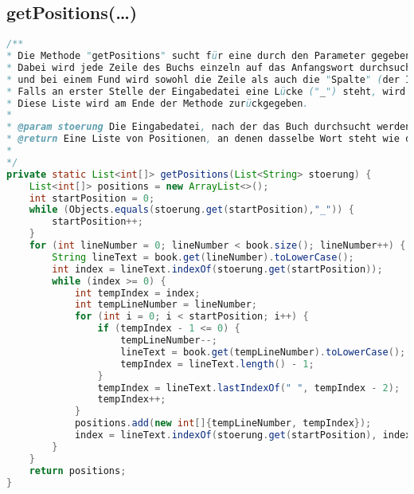 \documentclass[a4paper, 10pt, ngerman]{scrartcl}
\begin{document}
\subsection{getPositions(\ldots)}\label{sec:getPositions()}
\begin{lstlisting}[frame=single, language=Java, title=Methode getPositions, breaklines=true, label=lst:getPosition]
/**
* Die Methode "getPositions" sucht für eine durch den Parameter gegebene Eingabedatei das erste Wort im Buch.
* Dabei wird jede Zeile des Buchs einzeln auf das Anfangswort durchsucht
* und bei einem Fund wird sowohl die Zeile als auch die "Spalte" (der Index in der Zeile, an der das Wort beginnt) als Array an die Liste von Positionen hinzugefügt.
* Falls an erster Stelle der Eingabedatei eine Lücke ("_") steht, wird nach dem zweiten Wort gesucht und dann die Position für das vorherige Wort bestimmt.
* Diese Liste wird am Ende der Methode zurückgegeben.
*
* @param stoerung Die Eingabedatei, nach der das Buch durchsucht werden soll
* @return Eine Liste von Positionen, an denen dasselbe Wort steht wie das erste Wort der Eingabedatei
*
*/
private static List<int[]> getPositions(List<String> stoerung) {
	List<int[]> positions = new ArrayList<>();
    int startPosition = 0;
    while (Objects.equals(stoerung.get(startPosition),"_")) {
    	startPosition++;
    }
    for (int lineNumber = 0; lineNumber < book.size(); lineNumber++) {
        String lineText = book.get(lineNumber).toLowerCase();
        int index = lineText.indexOf(stoerung.get(startPosition));
        while (index >= 0) {
        	int tempIndex = index;
            int tempLineNumber = lineNumber;
            for (int i = 0; i < startPosition; i++) {
                if (tempIndex - 1 <= 0) {
                    tempLineNumber--;
                    lineText = book.get(tempLineNumber).toLowerCase();
                    tempIndex = lineText.length() - 1;
                }
                tempIndex = lineText.lastIndexOf(" ", tempIndex - 2);
                tempIndex++;
            }
            positions.add(new int[]{tempLineNumber, tempIndex});
            index = lineText.indexOf(stoerung.get(startPosition), index + 1);
        }
    }
    return positions;
}
\end{lstlisting}

\clearpage
\end{document}
